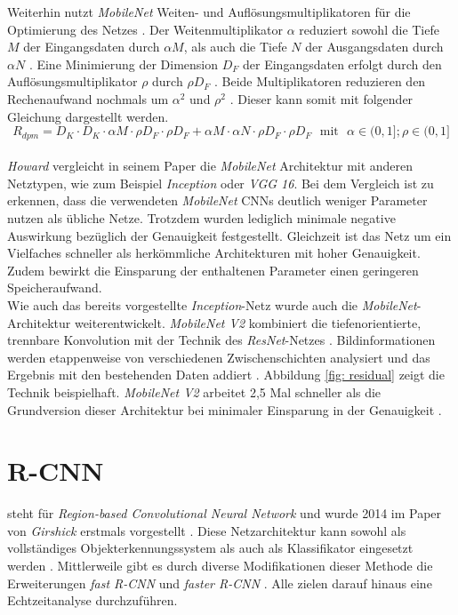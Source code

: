 		
		Weiterhin nutzt \textit{MobileNet} Weiten- und Auflösungsmultiplikatoren für die Optimierung des Netzes \cite{mobilenets}. Der Weitenmultiplikator $\alpha$ reduziert sowohl die Tiefe $M$ der Eingangsdaten durch $\alpha M$, als auch die Tiefe $N$ der Ausgangsdaten durch $\alpha N$ \cite{mobilenets}. Eine Minimierung der Dimension $D_F$ der Eingangsdaten erfolgt durch den Auflösungsmultiplikator $\rho$ durch $\rho D_F$ \cite{mobilenets}. Beide Multiplikatoren reduzieren den Rechenaufwand nochmals um $\alpha^2$ und $\rho^2$ \cite{mobilenets}. Dieser kann somit mit folgender Gleichung dargestellt werden. \\
		
		\begin{equation}
			R_{dpm}=D_K \cdot D_K \cdot \alpha M \cdot \rho D_F \cdot \rho D_F + \alpha M \cdot \alpha N \cdot \rho D_F \cdot \rho D_F \text{  }\text{mit}\text{  } \alpha \in (0,1] ; \rho \in (0,1]
			\label{eq: rechenaufwand w}
		\end{equation}\\
	
		\textit{Howard} vergleicht in seinem Paper die \textit{MobileNet} Architektur mit anderen Netztypen, wie zum Beispiel \textit{Inception} oder \textit{VGG 16}. Bei dem Vergleich ist zu erkennen, dass die verwendeten \textit{MobileNet} CNNs deutlich weniger Parameter nutzen als übliche Netze. Trotzdem wurden lediglich minimale negative Auswirkung bezüglich der Genauigkeit festgestellt. Gleichzeit ist das Netz um ein Vielfaches schneller als herkömmliche Architekturen mit hoher Genauigkeit. Zudem bewirkt die Einsparung der enthaltenen Parameter einen geringeren Speicheraufwand. \\
		
		Wie auch das bereits vorgestellte \textit{Inception}-Netz wurde auch die \textit{MobileNet}-Architektur weiterentwickelt. \textit{MobileNet V2} kombiniert die tiefenorientierte, trennbare Konvolution mit der Technik des \textit{ResNet}-Netzes \cite{mobilenetv2}. Bildinformationen werden etappenweise von verschiedenen Zwischenschichten analysiert und das Ergebnis mit den bestehenden Daten addiert \cite{mobilenetv2}. Abbildung \ref{fig: residual} zeigt die Technik beispielhaft. \textit{MobileNet V2} arbeitet 2,5 Mal schneller als die Grundversion dieser Architektur bei minimaler Einsparung in der Genauigkeit \cite{mobilenetv2}.
		
	
		\section*{R-CNN}
		 steht für \textit{Region-based Convolutional Neural Network} und wurde 2014 im Paper von \textit{Girshick} erstmals vorgestellt \cite{rcnn}. Diese Netzarchitektur kann sowohl als vollständiges Objekterkennungssystem als auch als Klassifikator eingesetzt werden \cite{rcnn}\cite{rcnnarchitektur}. Mittlerweile gibt es durch diverse Modifikationen dieser Methode die Erweiterungen \textit{fast R-CNN} und \textit{faster R-CNN} \cite{fastrcnn} \cite{fasterrcnn}. Alle zielen darauf hinaus eine Echtzeitanalyse durchzuführen.\\
		
